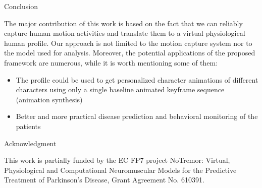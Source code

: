 \documentclass[final]{beamer}
\newlength{\onecolwid}
\begin{document}
\begin{frame}[t]
\begin{columns}[t]
\begin{column}{\onecolwid}

\begin{block}{Conclusion}

The major contribution of this work is based on the fact that we can reliably capture human motion activities and translate them to a virtual physiological human profile. Our approach is not limited to the motion capture system nor to the model used for analysis. Moreover, the potential applications of the proposed framework are numerous, while it is worth mentioning some of them:

\begin{itemize}
	\item The profile could be used to get personalized character animations of different characters using only a single baseline animated keyframe sequence (animation synthesis)
	\item Better and more practical disease prediction and behavioral monitoring of the patients
\end{itemize}

\end{block}



%
%



\begin{block}{Acknowledgment}
	
	This work is partially funded by the EC FP7 project NoTremor: Virtual, Physiological and Computational Neuromuscular Models for the Predictive Treatment of Parkinson's Disease, Grant Agreement No. 610391.
	

\end{block}
\end{column}
\end{columns}
\end{frame}
\end{document}
